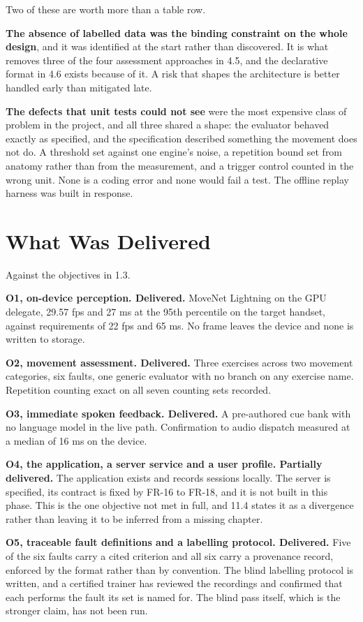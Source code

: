 Two of these are worth more than a table row.

\textbf{The absence of labelled data was the binding constraint on the whole design}, and it was identified at the start rather than discovered. It is what removes three of the four assessment approaches in 4.5, and the declarative format in 4.6 exists because of it. A risk that shapes the architecture is better handled early than mitigated late.

\textbf{The defects that unit tests could not see} were the most expensive class of problem in the project, and all three shared a shape: the evaluator behaved exactly as specified, and the specification described something the movement does not do. A threshold set against one engine's noise, a repetition bound set from anatomy rather than from the measurement, and a trigger control counted in the wrong unit. None is a coding error and none would fail a test. The offline replay harness was built in response.

\section{What Was Delivered}
\label{sec:11.3}

Against the objectives in 1.3.

\textbf{O1, on-device perception. Delivered.} MoveNet Lightning on the GPU delegate, 29.57 fps and 27 ms at the 95th percentile on the target handset, against requirements of 22 fps and 65 ms. No frame leaves the device and none is written to storage.

\textbf{O2, movement assessment. Delivered.} Three exercises across two movement categories, six faults, one generic evaluator with no branch on any exercise name. Repetition counting exact on all seven counting sets recorded.

\textbf{O3, immediate spoken feedback. Delivered.} A pre-authored cue bank with no language model in the live path. Confirmation to audio dispatch measured at a median of 16 ms on the device.

\textbf{O4, the application, a server service and a user profile. Partially delivered.} The application exists and records sessions locally. The server is specified, its contract is fixed by FR-16 to FR-18, and it is not built in this phase. This is the one objective not met in full, and 11.4 states it as a divergence rather than leaving it to be inferred from a missing chapter.

\textbf{O5, traceable fault definitions and a labelling protocol. Delivered.} Five of the six faults carry a cited criterion and all six carry a provenance record, enforced by the format rather than by convention. The blind labelling protocol is written, and a certified trainer has reviewed the recordings and confirmed that each performs the fault its set is named for. The blind pass itself, which is the stronger claim, has not been run.

